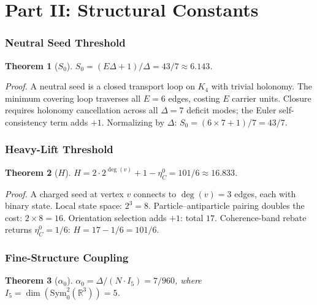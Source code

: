 \documentclass[11pt,twocolumn]{article}
\newtheorem{theorem}{Theorem}
\begin{document}

\part*{Part II: Structural Constants}

\section{Neutral Seed Threshold}
\label{sec:S0}

\begin{theorem}[$S_0$]
\label{thm:S0}
$S_0=(E\Delta+1)/\Delta=43/7\approx 6.143$.
\end{theorem}

\textit{Proof.}
A neutral seed is a closed transport loop on $K_4$ with trivial holonomy.
The minimum covering loop traverses all $E=6$ edges, costing $E$ carrier units.
Closure requires holonomy cancellation across all $\Delta=7$ deficit modes; the Euler self-consistency term adds $+1$.
Normalizing by $\Delta$: $S_0=(6\times 7+1)/7=43/7$.

\section{Heavy-Lift Threshold}
\label{sec:H}

\begin{theorem}[$H$]
\label{thm:H}
$H=2\cdot 2^{\deg(v)}+1-\eta_C^0=101/6\approx 16.833$.
\end{theorem}

\textit{Proof.}
A charged seed at vertex $v$ connects to $\deg(v)=3$ edges, each with binary state.
Local state space: $2^3=8$.
Particle--antiparticle pairing doubles the cost: $2\times 8=16$.
Orientation selection adds $+1$: total $17$.
Coherence-band rebate returns $\eta_C^0=1/6$: $H=17-1/6=101/6$.

\section{Fine-Structure Coupling}
\label{sec:alpha}

\begin{theorem}[$\alpha_0$]
\label{thm:alpha}
$\alpha_0=\Delta/(N\cdot I_5)=7/960$, where $I_5=\dim(\mathrm{Sym}^2_0(\mathbb{R}^3))=5$.
\end{theorem}
\end{document}
